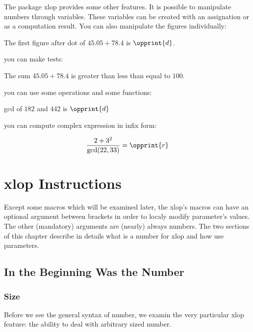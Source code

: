 \documentclass[12pt]{report}
\newcommand\package[1]{\textsf{#1}}
\begin{document}
The package \package{xlop} provides some other features. It is
possible to manipulate numbers through variables. These variables can
be created with an assignation or as a computation result. You can
also manipulate the figures individually:
\begin{SideBySideExample}
  The first figure after dot of
  $45.05+78.4$ is
  $\opprint{d}$.
\end{SideBySideExample}
you can make tests:
\begin{SideBySideExample}
  The sum $45.05+78.4$ is
  \ifopgt greater than
  \else\ifoplt less than
  \else equal to
  \fi\fi
  $100$.
\end{SideBySideExample}
you can use some operations and some functions:
\begin{SideBySideExample}
  gcd of $182$ and $442$ is
  $\opprint{d}$
\end{SideBySideExample}
you can compute complex expression in infix form:
\begin{SideBySideExample}
  $$\frac{2+3^2}{\gcd(22,33)} =
    \opprint{r}$$
\end{SideBySideExample}

\chapter{\package{xlop} Instructions}
Except some macros which will be examined later, the \package{xlop}'s
macros can have an optional argument between brackets in order
to localy modify parameter's values. The other (mandatory) arguments
are (nearly) always numbers. The two sections of this chapter describe
in details what is a number for \package{xlop} and how use parameters.

\section{In the Beginning Was the Number}
\label{sec:Au début etait le nombre}
\subsection{Size}
\label{subsec:Taille}
Before we see the general syntax of number, we examin the very
particular \package{xlop} feature: the ability to deal with arbitrary
sized number.
\end{document}
